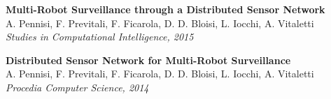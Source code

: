 \begin{frame}
	\tiny
	
	\textbf{Multi-Robot Surveillance through a Distributed Sensor Network} \\
	A. Pennisi, F. Previtali, F. Ficarola, D. D. Bloisi, L. Iocchi, A. Vitaletti \\
	\emph{Studies in Computational Intelligence, 2015} \\
	
	\vspace{0.1cm}
	
	\textbf{Distributed Sensor Network for Multi-Robot Surveillance} \\
	A. Pennisi, F. Previtali, F. Ficarola, D. D. Bloisi, L. Iocchi, A. Vitaletti \\
	\emph{Procedia Computer Science, 2014} \\
\end{frame}

